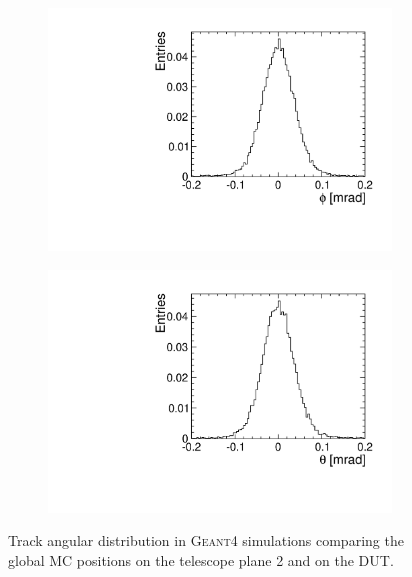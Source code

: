 \begin{figure}[htbp] \centering
  \begin{subfigure}[b]{0.45\textwidth}
    \includegraphics[width=\textwidth]{./figures/Telescope/MC_trackAnglePhi_planes_302_50.pdf}
    \caption{}
  \end{subfigure}\hfill
  \begin{subfigure}[b]{0.45\textwidth}
    \includegraphics[width=\textwidth]{./figures/Telescope/MC_trackAngleTheta_planes_302_50.pdf}
    \caption{}
  \end{subfigure}
  \caption{Track angular distribution in \textsc{Geant4} simulations
    comparing the global MC positions on the telescope plane 2 and on
    the DUT.}
  \label{fig:MCbeamAngleDistr}
\end{figure}

